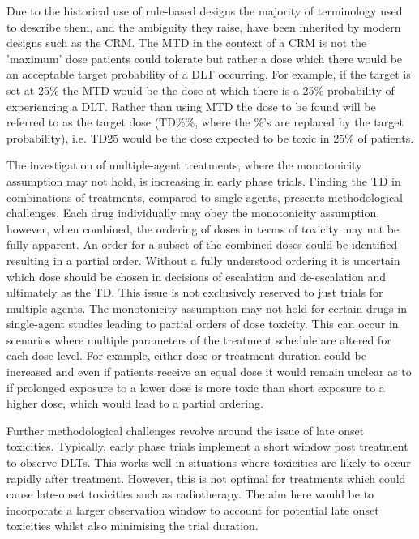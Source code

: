 Due to the historical use of rule-based designs the majority of terminology used to describe them, and the ambiguity they raise, have been inherited by modern designs such as the CRM. The MTD in the context of a CRM is not the 'maximum' dose patients could tolerate but rather a dose which there would be an acceptable target probability of a DLT occurring. For example, if the target is set at 25\% the MTD would be the dose at which there is a 25\% probability of experiencing a DLT. Rather than using MTD the dose to be found will be referred to as the target dose (TD\%\%, where the \%'s are replaced by the target probability), i.e. TD25 would be the dose expected to be toxic in 25\% of patients.

The investigation of multiple-agent treatments, where the monotonicity assumption may not hold, is increasing in early phase trials. Finding the TD in combinations of treatments, compared to single-agents,  presents methodological challenges. Each drug individually may obey the monotonicity assumption, however, when combined, the ordering of  doses in terms of toxicity may not be fully apparent. An order for a subset of the combined doses could be identified resulting in a partial order. Without a fully understood ordering it is uncertain which dose should be chosen in decisions of escalation and de-escalation and ultimately as the TD. This issue is not exclusively reserved to just trials for multiple-agents. The monotonicity assumption may not hold for certain drugs in single-agent studies leading to partial orders of dose toxicity. This can occur in scenarios where multiple parameters of the treatment schedule are altered for each dose level. For example, either dose or treatment duration could be increased and even if patients  receive an equal dose it would remain unclear as to if prolonged exposure to a lower dose is more toxic than short exposure to a higher dose, which would lead to a partial ordering. 

Further methodological challenges revolve around the issue of late onset toxicities. Typically, early phase trials implement a short window post treatment to observe DLTs. This works well in situations where toxicities are likely to occur rapidly after treatment. However, this is not optimal for treatments which could cause late-onset toxicities such as radiotherapy. The aim here would be to incorporate a larger observation window to account for potential late onset toxicities whilst also minimising the trial duration. 

